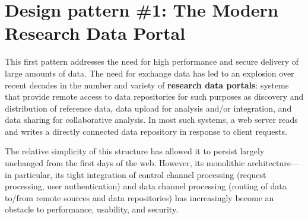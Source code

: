 \documentclass[10pt]{article}
\begin{document}
%


\section*{Design pattern \#1: The Modern Research Data Portal}

This first pattern addresses the need for high performance and secure delivery of 
large amounts of data.  
The need for exchange data has led to an explosion over recent decades in the
number and variety of \textbf{research data portals}:
systems that provide remote access to data repositories for 
such purposes as discovery and distribution of reference data,
data upload for analysis and/or integration, 
and data sharing for collaborative analysis.
In most such systems, a web server reads and writes a directly connected data repository 
in response to client requests.

The relative simplicity of this structure has allowed it to persist largely unchanged from the 
first days of the web.
However, its monolithic architecture---in particular, its tight integration of 
control channel processing (request processing, user authentication) and 
data channel processing (routing of data to/from remote sources and data repositories)
has increasingly become an obstacle to performance, usability, and security.
\end{document}
